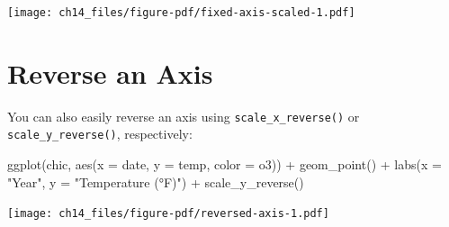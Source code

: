 \documentclass[
  letterpaper,
]{scrbook}
\newenvironment{Shaded}{\begin{snugshade}}{\end{snugshade}}
\newcommand{\AttributeTok}[1]{\textcolor[rgb]{0.40,0.45,0.13}{#1}}
\newcommand{\FunctionTok}[1]{\textcolor[rgb]{0.28,0.35,0.67}{#1}}
\newcommand{\NormalTok}[1]{\textcolor[rgb]{0.00,0.23,0.31}{#1}}
\newcommand{\SpecialCharTok}[1]{\textcolor[rgb]{0.37,0.37,0.37}{#1}}
\newcommand{\StringTok}[1]{\textcolor[rgb]{0.13,0.47,0.30}{#1}}
\begin{document}
\texttt{[image: ch14\_files/figure-pdf/fixed-axis-scaled-1.pdf]}

\section{Reverse an Axis}\label{reverse-an-axis}

You can also easily reverse an axis using \texttt{scale\_x\_reverse()}
or \texttt{scale\_y\_reverse()}, respectively:

\begin{Shaded}
\begin{Highlighting}[]
\FunctionTok{ggplot}\NormalTok{(chic, }\FunctionTok{aes}\NormalTok{(}\AttributeTok{x =}\NormalTok{ date, }\AttributeTok{y =}\NormalTok{ temp, }\AttributeTok{color =}\NormalTok{ o3)) }\SpecialCharTok{+}
  \FunctionTok{geom\_point}\NormalTok{() }\SpecialCharTok{+}
  \FunctionTok{labs}\NormalTok{(}\AttributeTok{x =} \StringTok{"Year"}\NormalTok{, }\AttributeTok{y =} \StringTok{"Temperature (°F)"}\NormalTok{) }\SpecialCharTok{+}
  \FunctionTok{scale\_y\_reverse}\NormalTok{()}
\end{Highlighting}
\end{Shaded}

\texttt{[image: ch14\_files/figure-pdf/reversed-axis-1.pdf]}
\end{document}
